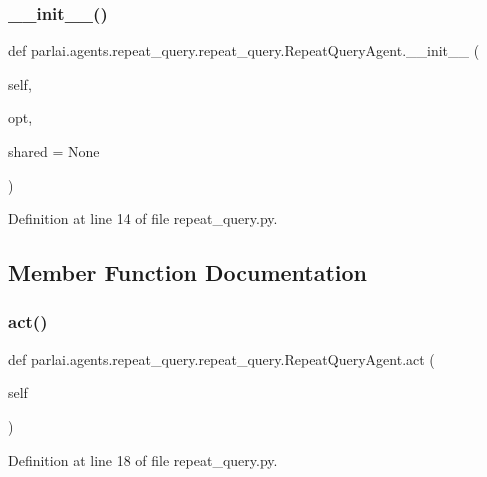\subsubsection{\texorpdfstring{\+\_\+\+\_\+init\+\_\+\+\_\+()}{\_\_init\_\_()}}
{\footnotesize\ttfamily def parlai.\+agents.\+repeat\+\_\+query.\+repeat\+\_\+query.\+Repeat\+Query\+Agent.\+\_\+\+\_\+init\+\_\+\+\_\+ (\begin{DoxyParamCaption}\item[{}]{self,  }\item[{}]{opt,  }\item[{}]{shared = {\ttfamily None} }\end{DoxyParamCaption})}



Definition at line 14 of file repeat\+\_\+query.\+py.



\subsection{Member Function Documentation}
\mbox{\label{classparlai_1_1agents_1_1repeat__query_1_1repeat__query_1_1RepeatQueryAgent_a7db5db4eda3e033a9022a4f4fe74419b}} 
\subsubsection{\texorpdfstring{act()}{act()}}
{\footnotesize\ttfamily def parlai.\+agents.\+repeat\+\_\+query.\+repeat\+\_\+query.\+Repeat\+Query\+Agent.\+act (\begin{DoxyParamCaption}\item[{}]{self }\end{DoxyParamCaption})}



Definition at line 18 of file repeat\+\_\+query.\+py.




